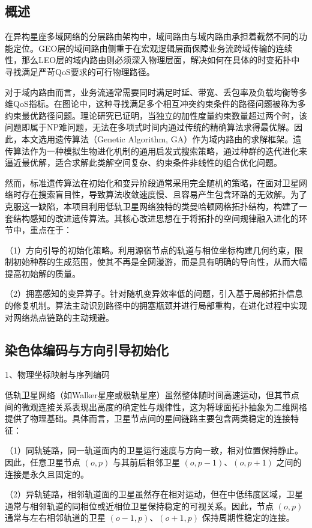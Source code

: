 \documentclass[print, master, vlined]{DissertUESTC}
\begin{document}
    \subsection{概述}
    在异构星座多域网络的分层路由架构中，域间路由与域内路由承担着截然不同的功能定位。GEO层的域间路由侧重于在宏观逻辑层面保障业务流跨域传输的连续性，那么LEO层的域内路由则必须深入物理层面，解决如何在具体的时变拓扑中寻找满足严苛QoS要求的可行物理路径。

    对于域内路由而言，业务流通常需要同时满足时延、带宽、丢包率及负载均衡等多维QoS指标。在图论中，这种寻找满足多个相互冲突约束条件的路径问题被称为多约束最优路径问题。理论研究已证明，当独立的加性度量约束数量超过两个时，该问题即属于NP难问题，无法在多项式时间内通过传统的精确算法求得最优解。因此，本文选用遗传算法（Genetic Algorithm, GA）作为域内路由的求解框架。遗传算法作为一种模拟生物进化机制的通用启发式搜索策略，通过种群的迭代进化来逼近最优解，适合求解此类解空间复杂、约束条件非线性的组合优化问题。
    
    然而，标准遗传算法在初始化和变异阶段通常采用完全随机的策略，在面对卫星网络时存在搜索盲目性，导致算法收敛速度慢、且容易产生包含环路的无效解。为了克服这一缺陷，本项目利用低轨卫星网络独特的类曼哈顿网格拓扑结构，构建了一套结构感知的改进遗传算法。其核心改进思想在于将拓扑的空间规律融入进化的环节中，重点在于：
    
    （1）方向引导的初始化策略。利用源宿节点的轨道与相位坐标构建几何约束，限制初始种群的生成范围，使其不再是全网漫游，而是具有明确的导向性，从而大幅提高初始解的质量。
    
    （2）拥塞感知的变异算子。针对随机变异效率低的问题，引入基于局部拓扑信息的修复机制。算法主动识别路径中的拥塞瓶颈并进行局部重构，在进化过程中实现对网络热点链路的主动规避。

    \subsection{染色体编码与方向引导初始化}
    1、物理坐标映射与序列编码

    低轨卫星网络（如Walker星座或极轨星座）虽然整体随时间高速运动，但其节点间的微观连接关系表现出高度的确定性与规律性，这为将球面拓扑抽象为二维网格提供了物理基础。具体而言，卫星节点间的星间链路主要包含两类稳定的连接特征：
    
    （1）同轨链路，同一轨道面内的卫星运行速度与方向一致，相对位置保持静止。因此，任意卫星节点 $(o, p)$ 与其前后相邻卫星 $(o, p-1)$、$(o, p+1)$ 之间的连接是永久且固定的。
    
    （2）异轨链路，相邻轨道面的卫星虽然存在相对运动，但在中低纬度区域，卫星通常与相邻轨道的同相位或近相位卫星保持稳定的可视关系。因此，节点 $(o, p)$ 通常与左右相邻轨道的卫星 $(o-1, p)$、$(o+1, p)$ 保持周期性稳定的连接。
    
\end{document}
